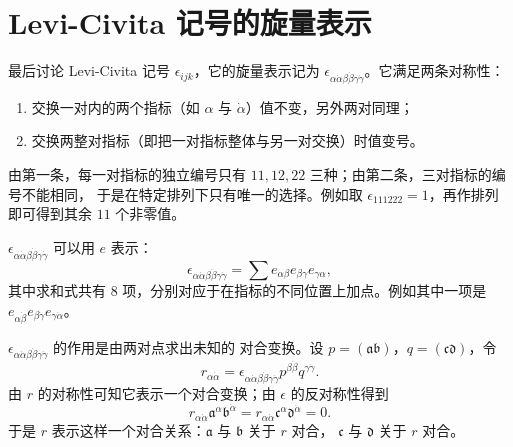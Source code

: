 \section{Levi-Civita 记号的旋量表示}

最后讨论 Levi-Civita 记号 $\epsilon_{ijk}$，它的旋量表示记为
$\epsilon_{\alpha\dot\alpha\beta\dot\beta\gamma\dot\gamma}$。它满足两条对称性：

\begin{enumerate}[label=(\arabic*),leftmargin=2.4em]
\item 交换一对内的两个指标（如 $\alpha$ 与 $\dot\alpha$）值不变，另外两对同理；
\item 交换两整对指标（即把一对指标整体与另一对交换）时值变号。
\end{enumerate}

由第一条，每一对指标的独立编号只有 $11,12,22$ 三种；由第二条，三对指标的编号不能相同，
于是在特定排列下只有唯一的选择。例如取 $\epsilon_{111222}=1$，再作排列即可得到其余
$11$ 个非零值。

$\epsilon_{\alpha\dot\alpha\beta\dot\beta\gamma\dot\gamma}$ 可以用 $e$ 表示：
\begin{equation}\label{eq:eps-formula}
\epsilon_{\alpha\dot\alpha\beta\dot\beta\gamma\dot\gamma}
=\sum e_{\alpha\beta}e_{\beta\gamma}e_{\gamma\alpha},
\end{equation}
其中求和式共有 $8$ 项，分别对应于在指标的不同位置上加点。例如其中一项是
$e_{\alpha\dot\beta}e_{\beta\dot\gamma}e_{\gamma\dot\alpha}$。

$\epsilon_{\alpha\dot\alpha\beta\dot\beta\gamma\dot\gamma}$ 的作用是由两对点求出未知的
对合变换。设 $p=(\mathfrak a\mathfrak b)$，$q=(\mathfrak c\mathfrak d)$，令
\[
r_{\alpha\dot\alpha}
=\epsilon_{\alpha\dot\alpha\beta\dot\beta\gamma\dot\gamma}
p^{\beta\dot\beta}q^{\gamma\dot\gamma}.
\]
由 $r$ 的对称性可知它表示一个对合变换；由 $\epsilon$ 的反对称性得到
\[
r_{\alpha\dot\alpha}\mathfrak a^\alpha\mathfrak b^{\dot\alpha}
=r_{\alpha\dot\alpha}\mathfrak c^\alpha\mathfrak d^{\dot\alpha}=0 .
\]
于是 $r$ 表示这样一个对合关系：$\mathfrak a$ 与 $\mathfrak b$ 关于 $r$ 对合，
$\mathfrak c$ 与 $\mathfrak d$ 关于 $r$ 对合。
